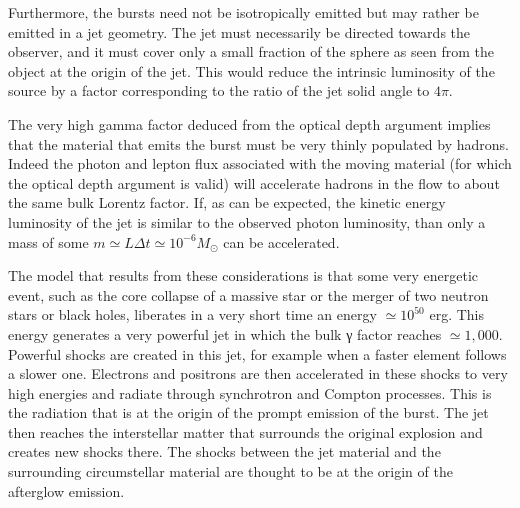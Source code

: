 \documentclass[12pt,a4paper]{article}
\begin{document}
Furthermore, the bursts need not be isotropically emitted but may rather be emitted in a jet geometry. The jet must necessarily be directed towards the observer, and it must cover only a small fraction of the sphere as seen from the object at the origin of the jet. This would reduce the intrinsic luminosity of the source by a factor corresponding to the ratio of the jet solid angle to $4 \pi$.

The very high gamma factor deduced from the optical depth argument implies that the material that emits the burst must be very thinly populated by hadrons. Indeed the photon and lepton flux associated with the moving material (for which the optical depth argument is valid) will accelerate hadrons in the flow to about the same bulk Lorentz factor. If, as can be expected, the kinetic energy luminosity of the jet is similar to the observed photon luminosity, than only a mass of some $m \simeq L \Delta t \simeq 10^{-6} M_\odot$ can be accelerated.

The model that results from these considerations is that some very energetic event, such as the core collapse of a massive star or the merger of two neutron stars or black holes, liberates in a very short time an energy $\simeq 10^{50}$ erg.  This energy generates a very powerful jet in which the bulk γ factor reaches $\simeq 1,000$. Powerful shocks are created in this jet, for example when a faster element follows a slower one. Electrons and positrons are then accelerated in these shocks to very high energies and radiate through synchrotron and Compton processes. This is the radiation that is at the origin of the prompt emission of the burst. The jet then reaches the interstellar matter that surrounds the original explosion and creates new shocks there. The shocks between the jet material and the surrounding circumstellar material are thought to be at the origin of the afterglow emission.
\end{document}
